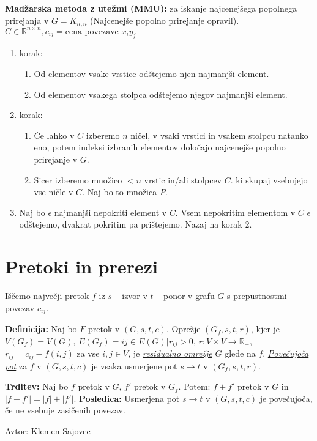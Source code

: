 \documentclass[8pt,a4paper]{amsart}
\theoremstyle{definition} %
\theoremstyle{plain} %
\newcommand{\R}{\mathbb R}
\begin{document}
\textbf{Madžarska metoda z utežmi (MMU):} za iskanje najcenejšega popolnega prirejanja v $G=K_{n,n}$ (Najcenejše popolno prirejanje opravil). $C \in \R^{n\times n}, c_{ij}=\text{cena povezave } x_iy_j$
\begin{enumerate}[1.]
\item korak:
\begin{enumerate}[a]
\item Od elementov vsake vrstice odštejemo njen najmanjši element.
\item Od elementov vsakega stolpca odštejemo njegov najmanjši element.
\end{enumerate}
\item korak:
\begin{enumerate}[a]
\item Če lahko v $C$ izberemo $n$ ničel, v vsaki vrstici in vsakem stolpcu natanko eno, potem indeksi izbranih elementov določajo najcenejše popolno prirejanje v $G$.
\item Sicer izberemo množico $<n$ vrstic in/ali stolpcev $C$. ki skupaj vsebujejo vse ničle v $C$. Naj bo to množica $P$.
\end{enumerate}
\item Naj bo $\epsilon$ najmanjši nepokriti element v $C$. Vsem nepokritim elementom v $C$ $\epsilon$ odštejemo, dvakrat pokritim pa prištejemo. Nazaj na korak 2.
\end{enumerate}

\section{Pretoki in prerezi}
Iščemo največji pretok $f$ iz $s$ -- izvor v $t$ -- ponor v grafu $G$ s prepustnostmi povezav $c_{ij}$.

\textbf{Definicija:} Naj bo $F$ pretok v $(G,s,t,c)$. Oprežje $(G_f,s,t,r)$, kjer je $V(G_f)=V(G)$, $E(G_f)={ij\in E(G) | r_{ij} > 0}$, $r:V\times V \longrightarrow \R_+$, $r_{ij}=c_{ij}-f(i,j)$ za vse $i,j \in V$, je \emph{\underline{residualno omrežje}} $G$ glede na $f$. \emph{\underline{Povečujoča pot}} za $f$ v $(G,s,t,c)$ je vsaka usmerjene pot $s \longrightarrow t$ v $(G_f,s,t,r)$.

\textbf{Trditev:} Naj bo $f$ pretok v $G$, $f'$ pretok v $G_f$. Potem: $f+f'$ pretok v $G$ in $|f+f'| = |f|+|f'|$.
\textbf{Posledica:} Usmerjena pot $s \longrightarrow t$ v $(G,s,t,c)$ je povečujoča, če ne vsebuje zasičenih povezav.


\vfill \hfill Avtor: Klemen Sajovec
\end{document}
